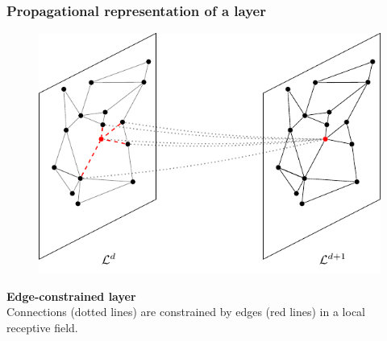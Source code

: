 \documentclass[t,9pt,pdftex]{beamer}
\theoremstyle{definition}
\newcommand{\cl}{\mathcal{L}}
\newcommand{\ccr}{\mathcal{R}}
\newcommand{\gve}{G = \langle V, E \rangle}
\begin{document}
\begin{frame}[c, label=current]
  \frametitle{Propagational representation of a layer}
  \begin{figure}
  \centering\includegraphics[width=0.51\linewidth,height=\textheight,keepaspectratio]{graphFig.pdf}
  \end{figure}

  \begin{definition}\textbf{Edge-constrained layer}\\
  Connections (dotted lines) are constrained by edges (red lines) in a local receptive field.
  \end{definition}

\end{frame}
\end{document}
